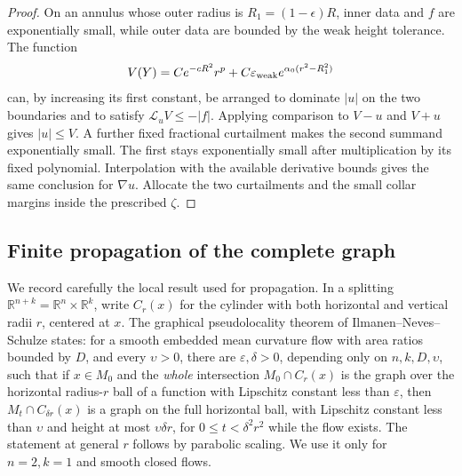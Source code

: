 \begin{proof}
On an annulus whose outer radius is $R_1=(1-\epsilon)R$, inner
data and $f$ are exponentially small, while outer data are
bounded by the weak height tolerance.  The function
\[
 V(Y)=C e^{-cR^2}r^p
       +C\varepsilon_{\rm weak}
                     e^{\alpha_0(r^2-R_1^2)}
\]
can, by increasing its first constant, be arranged to dominate
$|u|$ on the two boundaries and to satisfy
$\mathcal L_uV\le-|f|$.  Applying comparison to $V-u$ and
$V+u$ gives $|u|\le V$.  A further fixed fractional curtailment
makes the second summand exponentially small.  The first stays
exponentially small after multiplication by its fixed polynomial.
Interpolation with the available derivative bounds gives the
same conclusion for $\nabla u$.  Allocate the two curtailments
and the small collar margins inside the prescribed $\zeta$.
\end{proof}

\subsection{Finite propagation of the complete graph}

We record carefully the local result used for propagation.  In a
splitting $\mathbb R^{n+k}=\mathbb R^n\times\mathbb R^k$, write
$C_r(x)$ for the cylinder with both horizontal and vertical radii
$r$, centered at $x$.  The graphical pseudolocality theorem of
Ilmanen--Neves--Schulze \cite[Theorem~1.5]{INS2019} states:
for a smooth embedded mean curvature flow with area ratios bounded
by $D$, and every $\upsilon>0$, there are
$\varepsilon,\delta>0$, depending only on $n,k,D,\upsilon$, such
that if $x\in M_0$ and the \emph{whole} intersection
$M_0\cap C_r(x)$ is the graph over the horizontal radius-$r$
ball of a function with Lipschitz constant less than
$\varepsilon$, then $M_t\cap C_{\delta r}(x)$ is a graph on the
full horizontal ball, with Lipschitz constant less than
$\upsilon$ and height at most $\upsilon\delta r$, for
$0\le t<\delta^2r^2$ while the flow exists.  The statement at
general $r$ follows by parabolic scaling.  We use it only for
$n=2,k=1$ and smooth closed flows.

